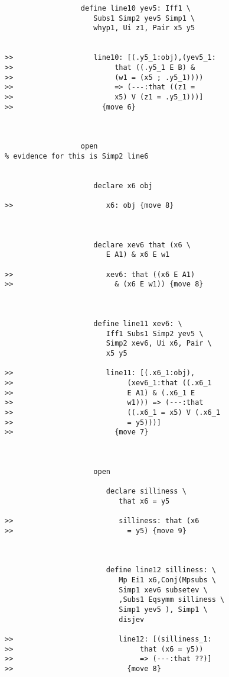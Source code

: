 \documentclass[12pt]{article}
\begin{document}
\begin{verbatim}
                  define line10 yev5: Iff1 \
                     Subs1 Simp2 yev5 Simp1 \
                     whyp1, Ui z1, Pair x5 y5


>>                   line10: [(.y5_1:obj),(yev5_1:
>>                        that ((.y5_1 E B) &
>>                        (w1 = (x5 ; .y5_1))))
>>                        => (---:that ((z1 =
>>                        x5) V (z1 = .y5_1)))]
>>                     {move 6}



                  open
% evidence for this is Simp2 line6


                     declare x6 obj

>>                      x6: obj {move 8}



                     declare xev6 that (x6 \
                        E A1) & x6 E w1

>>                      xev6: that ((x6 E A1)
>>                        & (x6 E w1)) {move 8}



                     define line11 xev6: \
                        Iff1 Subs1 Simp2 yev5 \
                        Simp2 xev6, Ui x6, Pair \
                        x5 y5

>>                      line11: [(.x6_1:obj),
>>                           (xev6_1:that ((.x6_1
>>                           E A1) & (.x6_1 E
>>                           w1))) => (---:that
>>                           ((.x6_1 = x5) V (.x6_1
>>                           = y5)))]
>>                        {move 7}



                     open

                        declare silliness \
                           that x6 = y5

>>                         silliness: that (x6
>>                           = y5) {move 9}



                        define line12 silliness: \
                           Mp Ei1 x6,Conj(Mpsubs \
                           Simp1 xev6 subsetev \
                           ,Subs1 Eqsymm silliness \
                           Simp1 yev5 ), Simp1 \
                           disjev

>>                         line12: [(silliness_1:
>>                              that (x6 = y5))
>>                              => (---:that ??)]
>>                           {move 8}




\end{verbatim}
\end{document}
